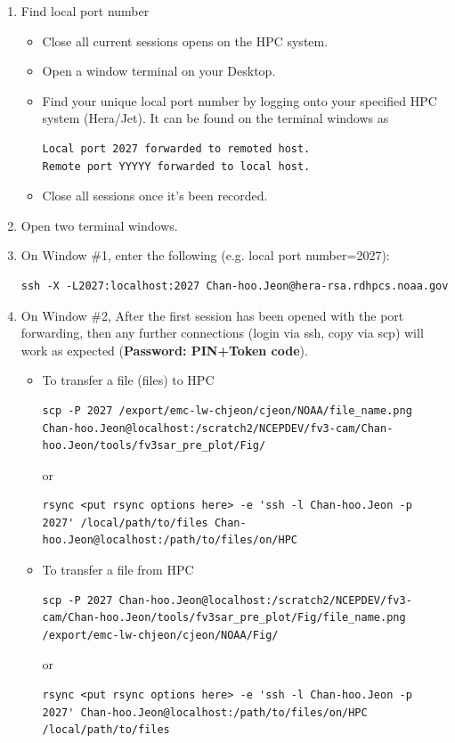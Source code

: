 \documentclass[11pt,fleqn]{report}              %
\begin{document}
\begin{enumerate}
\item Find local port number
   \begin{itemize}
   \item Close all current sessions opens on the HPC system.
   \item Open a window terminal on your Desktop.   
   \item Find your unique local port number by logging onto your specified HPC system (Hera/Jet). It can be found on the terminal windows as 
\lstset{language=bash}   
\begin{lstlisting}[frame=trBL]
Local port 2027 forwarded to remoted host.
Remote port YYYYY forwarded to local host.
\end{lstlisting}
   
   \item Close all sessions once it's been recorded.   
   \end{itemize}

\item Open two terminal windows.
\item On Window \#1, enter the following (e.g. local port number=2027):
\lstset{language=bash}   
\begin{lstlisting}[frame=trBL]
ssh -X -L2027:localhost:2027 Chan-hoo.Jeon@hera-rsa.rdhpcs.noaa.gov
\end{lstlisting}

\item On Window \#2, After the first session has been opened with the port forwarding, then any further connections (login via ssh, copy via scp) will work as expected ({\bf Password: PIN+Token code}).

   \begin{itemize}
   \item To transfer a file (files) to HPC
\lstset{language=bash}   
\begin{lstlisting}[frame=trBL]
scp -P 2027 /export/emc-lw-chjeon/cjeon/NOAA/file_name.png Chan-hoo.Jeon@localhost:/scratch2/NCEPDEV/fv3-cam/Chan-hoo.Jeon/tools/fv3sar_pre_plot/Fig/
\end{lstlisting}
or
\lstset{language=bash}   
\begin{lstlisting}[frame=trBL]
rsync <put rsync options here> -e 'ssh -l Chan-hoo.Jeon -p 2027' /local/path/to/files Chan-hoo.Jeon@localhost:/path/to/files/on/HPC
\end{lstlisting}
   
   \item To transfer a file from HPC
\lstset{language=bash}   
\begin{lstlisting}[frame=trBL]
scp -P 2027 Chan-hoo.Jeon@localhost:/scratch2/NCEPDEV/fv3-cam/Chan-hoo.Jeon/tools/fv3sar_pre_plot/Fig/file_name.png /export/emc-lw-chjeon/cjeon/NOAA/Fig/
\end{lstlisting}
or
\lstset{language=bash}   
\begin{lstlisting}[frame=trBL]
rsync <put rsync options here> -e 'ssh -l Chan-hoo.Jeon -p 2027' Chan-hoo.Jeon@localhost:/path/to/files/on/HPC /local/path/to/files 
\end{lstlisting}


\end{itemize}
\end{enumerate}
\end{document}
